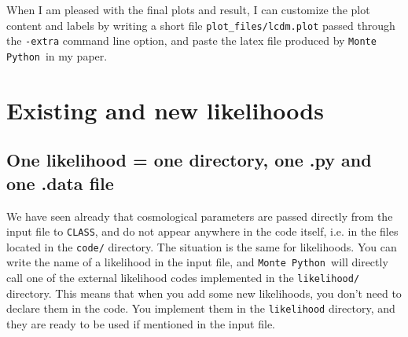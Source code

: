 \documentclass[10pt]{article}
\newcommand{\CLASS}{\texttt{CLASS}}
\newcommand{\MP}{\texttt{Monte Python}}
\begin{document}
When I am pleased with the final plots and result, I can customize the plot
content and labels by writing a short file \verb?plot_files/lcdm.plot? passed
through the \verb?-extra? command line option, and paste the latex file
produced by \MP~in my paper.

\section{Existing and new likelihoods\label{likelihoods}}

\subsection{One likelihood = one directory, one .py and one .data file\label{ssec:lkl}}

We have seen already that cosmological parameters are passed directly from the
input file to \CLASS, and do not appear anywhere in the code itself, i.e. in
the files located in the \verb?code/? directory. The situation is the same for
likelihoods. You can write the name of a likelihood in the input file, and
\MP~will directly call one of the external likelihood codes implemented in the
\verb?likelihood/? directory. This means that when you add some new
likelihoods, you don't need to declare them in the code. You implement them in
the \verb?likelihood? directory, and they are ready to be used if mentioned in
the input file.
\end{document}
